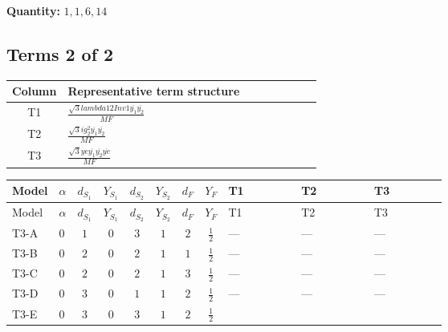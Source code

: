 \documentclass[8pt]{article}
\begin{document}
\begin{landscape}
\begin{longtable}{@{}llcccccc >{\raggedright\arraybackslash}p{0.21\linewidth} >{\raggedright\arraybackslash}p{0.21\linewidth} >{\raggedright\arraybackslash}p{0.21\linewidth}@{}}
\midrule
\bottomrule
\end{longtable}
\clearpage
\noindent\textbf{Quantity: }$\mathrm{1,1,6,14}$\par\smallskip
\subsection*{Terms 2 of 2}
\begin{center}
\begin{tabular}{@{}c >{\raggedright\arraybackslash}p{0.82\linewidth}@{}}
\toprule
Column & Representative term structure \\
\midrule
T1 & \(\displaystyle \frac{\sqrt{3} lambda12Inv1 \overline{y_{1}} \overline{y_{2}}}{MF}\) \\
\midrule
T2 & \(\displaystyle \frac{\sqrt{3} i g_{2}^{2} \overline{y_{1}} \overline{y_{2}}}{MF}\) \\
\midrule
T3 & \(\displaystyle \frac{\sqrt{3} ye \overline{y_{1}} \overline{y_{2}} \overline{ye}}{MF}\) \\
\midrule
\bottomrule
\end{tabular}
\end{center}
\smallskip
\tiny
\begin{longtable}{@{}llcccccc >{\raggedright\arraybackslash}p{0.21\linewidth} >{\raggedright\arraybackslash}p{0.21\linewidth} >{\raggedright\arraybackslash}p{0.21\linewidth}@{}}
\toprule
Model & $\alpha$ & $d_{S_1}$ & $Y_{S_1}$ & $d_{S_2}$ & $Y_{S_2}$ & $d_F$ & $Y_F$ & T1 & T2 & T3 \\
\midrule
\endfirsthead
\toprule
Model & $\alpha$ & $d_{S_1}$ & $Y_{S_1}$ & $d_{S_2}$ & $Y_{S_2}$ & $d_F$ & $Y_F$ & T1 & T2 & T3 \\
\midrule
\endhead
T3-A & $0$ & $1$ & $0$ & $3$ & $1$ & $2$ & $\frac{1}{2}$ & --- & --- & --- \\
\midrule
T3-B & $0$ & $2$ & $0$ & $2$ & $1$ & $1$ & $\frac{1}{2}$ & --- & --- & --- \\
\midrule
T3-C & $0$ & $2$ & $0$ & $2$ & $1$ & $3$ & $\frac{1}{2}$ & --- & --- & --- \\
\midrule
T3-D & $0$ & $3$ & $0$ & $1$ & $1$ & $2$ & $\frac{1}{2}$ & --- & --- & --- \\
\midrule
T3-E & $0$ & $3$ & $0$ & $3$ & $1$ & $2$ & $\frac{1}{2}$ & \scriptsize\adjustbox{max width=\linewidth}{$\begin{gathered} \frac{\sqrt{3} lambda12Inv1 \overline{y_{1}} \overline{y_{2}}}{6 MF}\end{gathered}$} & \scriptsize\adjustbox{max width=\linewidth}{$\begin{gathered} - \frac{\sqrt{3} i g_{2}^{2} \overline{y_{1}} \overline{y_{2}}}{6 MF}\end{gathered}$} & \scriptsize\adjustbox{max width=\linewidth}{$\begin{gathered} \frac{\sqrt{3} ye \overline{y_{1}} \overline{y_{2}} \overline{ye}}{12 MF}\end{gathered}$} \\
\midrule
\bottomrule
\end{longtable}
\clearpage

\end{landscape}
\end{document}
